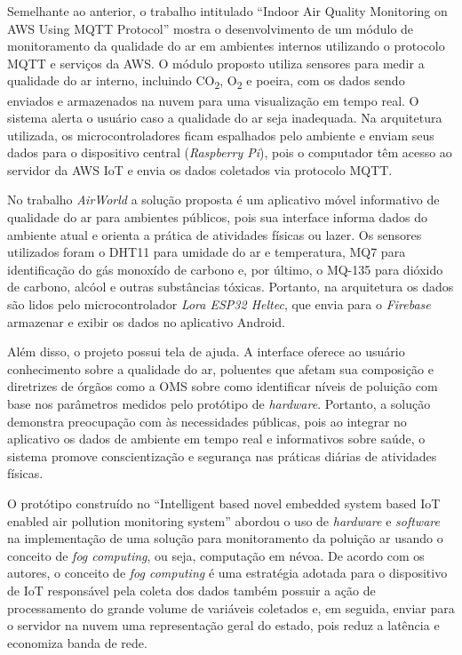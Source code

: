 Semelhante ao anterior, o trabalho intitulado ``Indoor Air Quality Monitoring on AWS Using MQTT Protocol'' \cite{iot-monitoring-on-aws} mostra o desenvolvimento de um módulo de monitoramento da qualidade do ar 
em ambientes internos utilizando o protocolo MQTT e serviços da AWS. O módulo proposto utiliza sensores para medir a qualidade do ar interno, incluindo CO\textsubscript{2}, O\textsubscript{2} e poeira, com os dados sendo enviados e armazenados na 
nuvem para uma visualização em tempo real. O sistema alerta o usuário caso a qualidade do ar seja inadequada. Na arquitetura utilizada, os microcontroladores ficam espalhados 
pelo ambiente e enviam seus dados para o dispositivo central (\textit{Raspberry Pi}), pois o computador têm acesso ao servidor da AWS IoT e envia os dados coletados via protocolo MQTT.

No trabalho \textit{AirWorld} \cite{UFAMAirWorld} a solução proposta é um aplicativo móvel informativo de qualidade do ar para ambientes públicos, pois 
sua interface informa dados do ambiente atual e orienta a prática de atividades físicas ou lazer. Os sensores utilizados foram o DHT11 para umidade do ar e temperatura, MQ7 para identificação do gás monoxído de 
carbono e, por último, o MQ-135 para dióxido de carbono, alcóol e outras substâncias tóxicas. Portanto, na arquitetura os dados são lidos pelo microcontrolador 
\textit{Lora ESP32 Heltec}, que envia para o \textit{Firebase} armazenar e exibir os dados no aplicativo Android. 

Além disso, o projeto possui tela de ajuda. A interface oferece ao usuário conhecimento sobre a qualidade do ar, poluentes que afetam sua composição e diretrizes de órgãos como a OMS sobre 
como identificar níveis de poluição com base nos parâmetros medidos pelo protótipo de \textit{hardware}. Portanto, a solução demonstra preocupação com às necessidades públicas, pois ao integrar 
no aplicativo os dados de ambiente em tempo real e informativos sobre saúde, o sistema promove conscientização e segurança nas práticas diárias de atividades físicas.

O protótipo construído no ``Intelligent based novel embedded system based IoT enabled air
pollution monitoring system'' \cite{tbRelacionado4NovelEmbeddedSystem} abordou o uso de \textit{hardware} e \textit{software} na implementação 
de uma solução para monitoramento da poluição ar usando o conceito de \textit{fog computing}, ou seja, computação em névoa. De acordo com os autores, o conceito de 
\textit{fog computing} é uma estratégia adotada para o dispositivo de IoT responsável pela coleta dos dados também possuir a ação de processamento do grande volume de variáveis coletados e, 
em seguida, enviar para o servidor na nuvem uma representação geral do estado, pois reduz a latência e economiza banda de rede.

